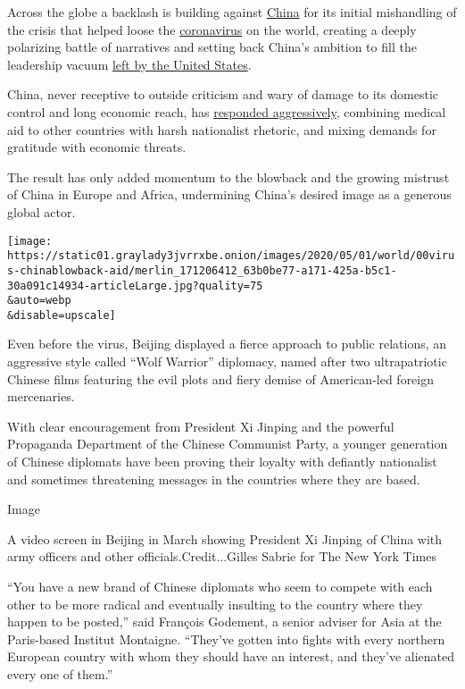 Across the globe a backlash is building against
\href{https://www.nytimes3xbfgragh.onion/2020/05/11/world/australia/coronavirus-china-inquiry.html}{China}
for its initial mishandling of the crisis that helped loose the
\href{https://www.nytimes3xbfgragh.onion/2020/05/21/business/economy/coronavirus-china-economy.html}{coronavirus}
on the world, creating a deeply polarizing battle of narratives and
setting back China's ambition to fill the leadership vacuum
\href{https://www.nytimes3xbfgragh.onion/2020/05/03/us/coronavirus-updates.html}{left
by the United States}.

China, never receptive to outside criticism and wary of damage to its
domestic control and long economic reach, has
\href{https://www.nytimes3xbfgragh.onion/2020/05/11/world/australia/coronavirus-china-inquiry.html}{responded
aggressively}, combining medical aid to other countries with harsh
nationalist rhetoric, and mixing demands for gratitude with economic
threats.

The result has only added momentum to the blowback and the growing
mistrust of China in Europe and Africa, undermining China's desired
image as a generous global actor.

\texttt{[image: https://static01.graylady3jvrrxbe.onion/images/2020/05/01/world/00virus-chinablowback-aid/merlin\_171206412\_63b0be77-a171-425a-b5c1-30a091c14934-articleLarge.jpg?quality=75\\\&auto=webp\\\&disable=upscale]}

Even before the virus, Beijing displayed a fierce approach to public
relations, an aggressive style called ``Wolf Warrior'' diplomacy, named
after two ultrapatriotic Chinese films featuring the evil plots and
fiery demise of American-led foreign mercenaries.

With clear encouragement from President Xi Jinping and the powerful
Propaganda Department of the Chinese Communist Party, a younger
generation of Chinese diplomats have been proving their loyalty with
defiantly nationalist and sometimes threatening messages in the
countries where they are based.

Image

A video screen in Beijing in March showing President Xi Jinping of China
with army officers and other officials.Credit...Gilles Sabrie for The
New York Times

``You have a new brand of Chinese diplomats who seem to compete with
each other to be more radical and eventually insulting to the country
where they happen to be posted,'' said François Godement, a senior
adviser for Asia at the Paris-based Institut Montaigne. ``They've gotten
into fights with every northern European country with whom they should
have an interest, and they've alienated every one of them.''

